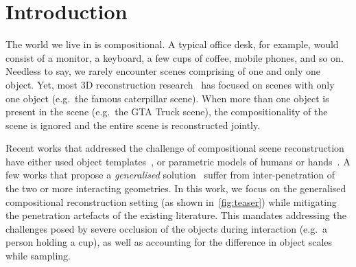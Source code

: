 \section{Introduction}\label{sec:intro} 


The world we live in is compositional.
A typical office desk, for example, would consist of a monitor, a keyboard, a few cups of coffee, mobile phones, and so on.
Needless to say, we rarely encounter scenes comprising of one and only one object.
Yet, most 3D reconstruction research~\cite{mildenhall2020nerf, zhang2021stnerf, weng2022humannerf, rosu2023permutosdf, yariv2021volume, wang2021neus} has focused on scenes with only one object (e.g.~the famous caterpillar scene).
When more than one object is present in the scene (e.g.~the GTA Truck scene), the compositionality of the scene is ignored and the entire scene is reconstructed jointly.
\par
Recent works that addressed the challenge of compositional scene reconstruction have either used object templates~\cite{zhang2023neuraldome, bhatnagar22behave, fan2023arctic, GRAB:2020}, or parametric models of humans or hands~\cite{huang2022hhor, ye2022ihoi, Hi4D}.
A few works that propose a \textit{generalised} solution~\cite{wu2022object, Wu2023objectsdfplus} suffer from inter-penetration of the two or more interacting geometries.
In this work, we focus on the generalised compositional reconstruction setting (as shown in~\cref{fig:teaser}) while mitigating the penetration artefacts of the existing literature.
This mandates addressing the challenges posed by severe occlusion of the objects during interaction (e.g.~a person holding a cup), as well as accounting for the difference in object scales while sampling.

